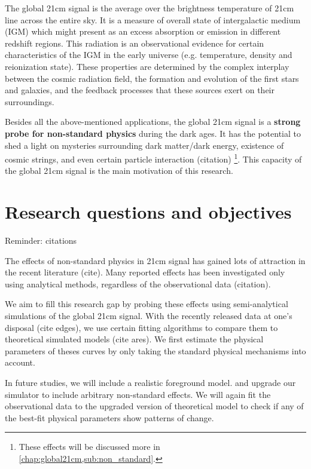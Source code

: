 \documentclass[12pt, TexShade, letterpaper]{report}
\begin{document}
The global 21cm signal is the average over the brightness temperature of 21cm line across the entire sky. It is a measure of overall state of intergalactic medium (IGM) which might present as an excess absorption or emission in different redshift regions. This radiation is an observational evidence for certain characteristics of the IGM in the early universe (e.g. temperature, density and reionization state). These properties are determined by the complex interplay between the cosmic radiation field, the formation and evolution of the first stars and galaxies, and the feedback processes that these sources exert on their surroundings\cite{21century}.\par
Besides all the above-mentioned applications, the global 21cm signal is a \textbf{strong probe for non-standard physics} during the dark ages. It has the potential to shed a light on mysteries surrounding dark matter/dark energy, existence of cosmic strings, and even certain particle interaction (citation) \footnote{These effects will be discussed more in \ref{chap:global21cm,sub:non_standard}.}. This capacity of the global 21cm signal is the main motivation of this research.\par
\section{Research questions and objectives}
Reminder: citations \par
The effects of non-standard physics in 21cm signal has gained lots of attraction in the recent literature (cite). Many reported effects has been investigated only using analytical methods, regardless of the observational data (citation).\par
We aim to fill this research gap by probing these effects using semi-analytical simulations of the global 21cm signal. With the recently released data at one's disposal (cite edges), we use certain fitting algorithms to compare them to theoretical simulated models (cite ares). We first estimate the physical parameters of theses curves by only taking the standard physical mechanisms into account.\par
In future studies, we will include a realistic foreground model. and upgrade our simulator to include arbitrary non-standard effects. We will again fit the observational data to the upgraded version of theoretical model to check if any of the best-fit physical parameters show patterns of change.\par
\end{document}
